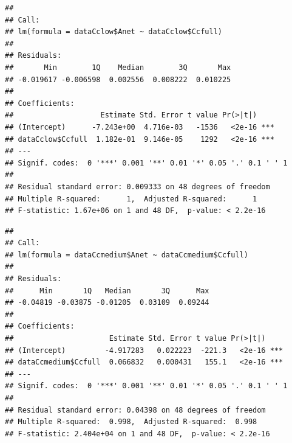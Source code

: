 \documentclass[
]{krantz}
\makeatletter
\newenvironment{Shaded}{\begin{snugshade}}{\end{snugshade}}
\newcommand{\DecValTok}[1]{\textcolor[rgb]{0.00,0.00,0.81}{#1}}
\newcommand{\KeywordTok}[1]{\textcolor[rgb]{0.13,0.29,0.53}{\textbf{#1}}}
\newcommand{\NormalTok}[1]{#1}
\newcommand{\OperatorTok}[1]{\textcolor[rgb]{0.81,0.36,0.00}{\textbf{#1}}}
\newcommand{\StringTok}[1]{\textcolor[rgb]{0.31,0.60,0.02}{#1}}
\newenvironment{kframe}{%
\medskip{}
\setlength{\fboxsep}{.8em}
 \def\at@end@of@kframe{}%
 \ifinner\ifhmode%
  \def\at@end@of@kframe{\end{minipage}}%
  \begin{minipage}{\columnwidth}%
 \fi\fi%
 \def\FrameCommand##1{\hskip\@totalleftmargin \hskip-\fboxsep
 \colorbox{shadecolor}{##1}\hskip-\fboxsep
     \hskip-\linewidth \hskip-\@totalleftmargin \hskip\columnwidth}%
 \MakeFramed {\advance\hsize-\width
   \@totalleftmargin\z@ \linewidth\hsize
   \@setminipage}}%
 {\par\unskip\endMakeFramed%
 \at@end@of@kframe}
\renewenvironment{Shaded}{\begin{kframe}}{\end{kframe}}
\makeatother
\begin{document}
\begin{Shaded}
\end{Shaded}

\begin{verbatim}
## 
## Call:
## lm(formula = dataCclow$Anet ~ dataCclow$Ccfull)
## 
## Residuals:
##       Min        1Q    Median        3Q       Max 
## -0.019617 -0.006598  0.002556  0.008222  0.010225 
## 
## Coefficients:
##                    Estimate Std. Error t value Pr(>|t|)    
## (Intercept)      -7.243e+00  4.716e-03   -1536   <2e-16 ***
## dataCclow$Ccfull  1.182e-01  9.146e-05    1292   <2e-16 ***
## ---
## Signif. codes:  0 '***' 0.001 '**' 0.01 '*' 0.05 '.' 0.1 ' ' 1
## 
## Residual standard error: 0.009333 on 48 degrees of freedom
## Multiple R-squared:      1,	Adjusted R-squared:      1 
## F-statistic: 1.67e+06 on 1 and 48 DF,  p-value: < 2.2e-16
\end{verbatim}

\begin{Shaded}
\end{Shaded}

\begin{verbatim}
## 
## Call:
## lm(formula = dataCcmedium$Anet ~ dataCcmedium$Ccfull)
## 
## Residuals:
##      Min       1Q   Median       3Q      Max 
## -0.04819 -0.03875 -0.01205  0.03109  0.09244 
## 
## Coefficients:
##                      Estimate Std. Error t value Pr(>|t|)    
## (Intercept)         -4.917283   0.022223  -221.3   <2e-16 ***
## dataCcmedium$Ccfull  0.066832   0.000431   155.1   <2e-16 ***
## ---
## Signif. codes:  0 '***' 0.001 '**' 0.01 '*' 0.05 '.' 0.1 ' ' 1
## 
## Residual standard error: 0.04398 on 48 degrees of freedom
## Multiple R-squared:  0.998,	Adjusted R-squared:  0.998 
## F-statistic: 2.404e+04 on 1 and 48 DF,  p-value: < 2.2e-16
\end{verbatim}
\end{document}
